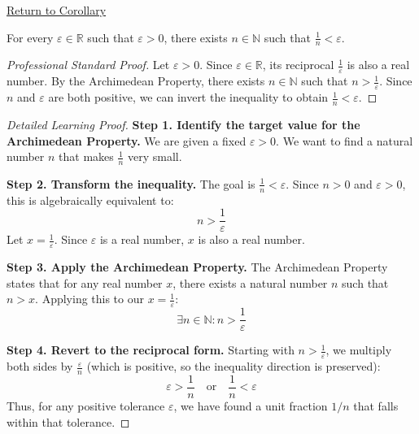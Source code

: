 \newpage
{}
\label{prf:archimedean-reciprocal}

\begin{remark*}[Return]
\hyperref[cor:archimedean-reciprocal]{Return to Corollary}
\end{remark*}

\begin{corollary*}
For every $\varepsilon \in \mathbb{R}$ such that $\varepsilon > 0$, there exists $n \in \mathbb{N}$ such that $\frac{1}{n} < \varepsilon$.
\end{corollary*}

\begin{proof}[Professional Standard Proof]
\LRAProofBodyStart
Let $\varepsilon > 0$. Since $\varepsilon \in \mathbb{R}$, its reciprocal $\frac{1}{\varepsilon}$ is also a real number. By the Archimedean Property, there exists $n \in \mathbb{N}$ such that $n > \frac{1}{\varepsilon}$. Since $n$ and $\varepsilon$ are both positive, we can invert the inequality to obtain $\frac{1}{n} < \varepsilon$.
\end{proof}

\begin{proof}[Detailed Learning Proof]
\LRAProofBodyStart

\textbf{Step 1. Identify the target value for the Archimedean Property.}
We are given a fixed $\varepsilon > 0$. We want to find a natural number $n$ that makes $\frac{1}{n}$ very small. 

\textbf{Step 2. Transform the inequality.}
The goal is $\frac{1}{n} < \varepsilon$. Since $n > 0$ and $\varepsilon > 0$, this is algebraically equivalent to:
\[ n > \frac{1}{\varepsilon} \]
Let $x = \frac{1}{\varepsilon}$. Since $\varepsilon$ is a real number, $x$ is also a real number.

\textbf{Step 3. Apply the Archimedean Property.}
The Archimedean Property states that for any real number $x$, there exists a natural number $n$ such that $n > x$. Applying this to our $x = \frac{1}{\varepsilon}$:
\[ \exists n \in \mathbb{N} : n > \frac{1}{\varepsilon} \]

\textbf{Step 4. Revert to the reciprocal form.}
Starting with $n > \frac{1}{\varepsilon}$, we multiply both sides by $\frac{\varepsilon}{n}$ (which is positive, so the inequality direction is preserved):
\[ \varepsilon > \frac{1}{n} \quad \text{or} \quad \frac{1}{n} < \varepsilon \]
Thus, for any positive tolerance $\varepsilon$, we have found a unit fraction $1/n$ that falls within that tolerance.
\end{proof}

